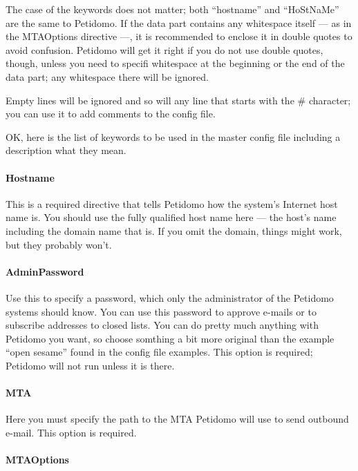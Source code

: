 \documentclass[a4paper,10pt]{scrreprt}
\begin{document}
The case of the keywords does not matter; both ``hostname'' and
``HoStNaMe'' are the same to Petidomo. If the data part contains any
whitespace itself --- as in the MTAOptions directive ---, it is
recommended to enclose it in double quotes to avoid confusion.
Petidomo will get it right if you do not use double quotes, though,
unless you need to specifi whitespace at the beginning or the end of
the data part; any whitespace there will be ignored.

Empty lines will be ignored and so will any line that starts with the
{\sf \#} character; you can use it to add comments to the config file.

OK, here is the list of keywords to be used in the master config file
including a description what they mean.

\paragraph{Hostname}

This is a required directive that tells Petidomo how the system's
Internet host name is. You should use the fully qualified host name
here --- the host's name including the domain name that is. If you
omit the domain, things might work, but they probably won't.

\paragraph{AdminPassword}

Use this to specify a password, which only the administrator of the
Petidomo systems should know. You can use this password to approve
e-mails or to subscribe addresses to closed lists. You can do pretty
much anything with Petidomo you want, so choose somthing a bit more
original than the example ``open sesame'' found in the config file
examples. This option is required; Petidomo will not run unless it is
there.

\paragraph{MTA}

Here you must specify the path to the MTA Petidomo will use to send
outbound e-mail. This option is required.

\paragraph{MTAOptions}
\end{document}
